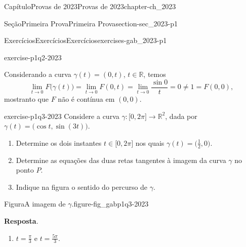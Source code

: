 \documentclass[oneside,10pt,]{book}
\newcommand{\blocktitlefont}{\relax}
\numberwithin{equation}{section}
\newcommand{\R}{\mathbb R}
\begin{document}
\begin{chapterptx}{Capítulo}{Provas de 2023}{}{Provas de 2023}{}{}{chapter-ch_2023}
\begin{sectionptx}{Seção}{Primeira Prova}{}{Primeira Prova}{}{}{section-sec_2023-p1}
\begin{exercises-subsection-numberless}{Exercícios}{Exercícios}{}{Exercícios}{}{}{exercises-gab_2023-p1}
\begin{divisionexercise}{2}{}{}{exercise-p1q2-2023}
\begin{enumerate}[label=\alph*]
%
\par
Considerando a curva \(\gamma(t)=(0,t)\), \(t\in\R\), temos%
\begin{equation*}
\lim\limits_{t\to
0}F\big(\gamma(t)\big)=\lim\limits_{t\to
0}F(0,t)=\lim\limits_{t\to 0}\dfrac{\sin 0}{t}=0\neq
1=F(0,0),
\end{equation*}
mostranto que \(F\) não é contínua em \((0,0)\).%
\end{enumerate}
%
\end{divisionexercise}%
\begin{divisionexercise}{3}{}{}{exercise-p1q3-2023}%
Considere a curva \(\gamma\colon
\big[0,2\pi\big]\to\R^2\), dada por \(\gamma(t)=\big(\cos t,
\sin(3t)\big)\).%
\begin{enumerate}[label=\alph*]
\item{}Determine	os dois instantes \(t\in \big[0,2\pi\big]\) nos quais \(\gamma(t)=\big(\frac{1}{2},0\big)\).%
\item{}Determine as equações das duas retas tangentes à imagem da curva \(\gamma\) no ponto \(P\).%
\item{}Indique na figura o sentido do percurso de \(\gamma\).%
\end{enumerate}
\begin{figureptx}{Figura}{A imagem de \(\gamma\).}{figure-fig_gabp1q3-2023}{}%
\begin{image}{0.25}{0.5}{0.25}{}%
%
\end{image}%
\tcblower
\end{figureptx}%
%
\par\smallskip%
\noindent\textbf{\blocktitlefont Resposta}.\hypertarget{answer-p1q3-2023-b}{}\quad{}%
\begin{enumerate}[label=\alph*]
\item{}\(t=\frac{\pi}{3}\) e \(t=\frac{5\pi}{3}\).%

\end{enumerate}
\end{divisionexercise}
\end{exercises-subsection-numberless}
\end{sectionptx}
\end{chapterptx}
\end{document}
